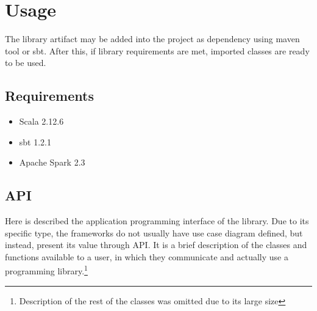 \section{Usage}
The library artifact may be added into the project as dependency using maven tool or sbt. After this, if library requirements are met, imported classes are ready to be used.

\subsection{Requirements}
\begin{itemize}
\item Scala 2.12.6
\item sbt 1.2.1
\item Apache Spark 2.3

\end{itemize}

\bigbreak
\subsection{API}
Here is described the application programming interface of the library. Due to its specific type, the frameworks do not usually have use case diagram defined, but instead, present its value through API. It is a brief description of the classes and functions available to a user, in which they communicate and actually use a programming library.\footnote{Description of the rest of the classes was omitted due to its large size}


